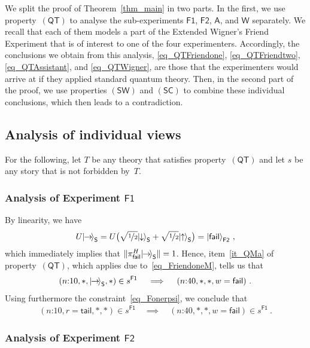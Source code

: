 \documentclass{article}
\theoremstyle{plain}
\theoremstyle{definition}
\newcommand*{\ket}[1]{{| #1 \rangle}}
\newcommand*{\Friendone}{\mathsf{F1}}
\newcommand*{\Friendtwo}{\mathsf{F2}}
\newcommand*{\Assistant}{\mathsf{A}}
\newcommand*{\Wigner}{\mathsf{W}}
\newcommand*{\Spin}{\mathsf{S}}
\newcommand*{\spinup}{\ket{{\hspace{-0.1ex}\uparrow\hspace{-0.1ex}}}}
\newcommand*{\spindown}{\ket{{\hspace{-0.1ex}\downarrow\hspace{-0.1ex}}}}
\newcommand*{\spinright}{\ket{{\hspace{-0.2ex}\rightarrow\hspace{-0.4ex}}}}
\newcommand*{\QT}{\mathsf{(QT)}}
\newcommand*{\SW}{\mathsf{(SW)}}
\newcommand*{\SelfCons}{\mathsf{(SC)}}
\newcommand*{\fail}{\mathsf{fail}}
\newcommand*{\tail}{\mathsf{tail}}
\begin{document}
We split the proof of Theorem~\ref{thm_main} in two parts. In the first, we use property~$\QT$ to analyse the sub-experiments $\Friendone$, $\Friendtwo$, $\Assistant$, and $\Wigner$ separately.  We recall that each of them models a part of the Extended Wigner's Friend Experiment that is of interest to one of the four experimenters. Accordingly,  the conclusions we obtain from this analysis, \eqref{eq_QTFriendone}, \eqref{eq_QTFriendtwo},  \eqref{eq_QTAssistant}, and \eqref{eq_QTWigner}, are those that the experimenters would arrive at if they applied standard quantum theory.  Then, in the second part of the proof, we use properties $\SW$ and $\SelfCons$ to combine these individual conclusions, which then leads to a contradiction. 

\subsection{Analysis of individual views} \label{sec_analysisindividual}

For the following, let $T$ be any theory that satisfies property~$\QT$ and let $s$ be any story that is not forbidden by~$T$.

\subsubsection*{Analysis of Experiment $\Friendone$} 

 By linearity, we have
\begin{align*}
  U \spinright_\Spin 
  = U \bigl(  \sqrt{\nicefrac{1}{2}} \spindown_\Spin + \sqrt{\nicefrac{1}{2}} \spinup_\Spin \bigr) 
  = \ket{\fail}_{\Friendtwo}  \ ,
\end{align*}
which immediately implies that $\|\pi_{\fail}^H \spinright_{\Spin}\| = 1$. Hence, item~\ref{it_QMa} of property~$\QT$, which applies due to~\eqref{eq_FriendoneM},  tells us that
\begin{align*}
  (\text{$n$:10}, *, \spinright_{\Spin}, *) \in s^{\Friendone}  \quad \implies \quad  (\text{$n$:40}, *, *, w=\fail) \ .
\end{align*}
Using furthermore the constraint~\eqref{eq_Fonerpsi}, we conclude that
\begin{align} \label{eq_QTFriendone}
  (\text{$n$:10}, r=\tail, *, *) \in s^{\Friendone}  
  \quad \implies \quad
   (\text{$n$:40}, *, *, w=\fail) \in s^{\Friendone}  \ .
\end{align}

\subsubsection*{Analysis of Experiment $\Friendtwo$}  
\end{document}
